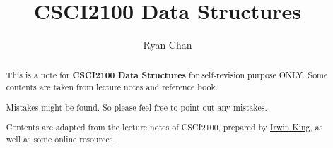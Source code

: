 \documentclass[a4paper]{report}
\author{Ryan Chan}
\title{CSCI2100 Data Structures}
\begin{document}
\setlength\parindent{0pt}

\maketitle

\newpage

\begin{abstract}
	This is a note for \textbf{CSCI2100 Data Structures} for self-revision purpose ONLY. Some contents are taken from lecture notes and reference book.
	
	Mistakes might be found. So please feel free to point out any mistakes.
	
	Contents are adapted from the lecture notes of CSCI2100, prepared by \href{https://www.cse.cuhk.edu.hk/irwin.king/}{Irwin King}, as well as some online resources. 
\end{abstract}

\newpage

\tableofcontents

\setlength{\parskip}{5pt}
\end{document}
